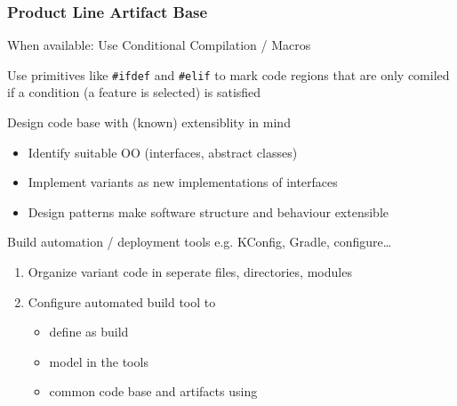 \documentclass[
    ../../Software_Engineering_Summary.tex,
]
{subfiles}
\begin{document}
\subsubsection{Product Line Artifact Base}
When available: Use Conditional Compilation / Macros

\begin{defbox}
    Use primitives like \texttt{\#ifdef} and \texttt{\#elif} to mark code regions that are only comiled if a condition (a feature is selected) is satisfied
\end{defbox}

Design code base with (known) extensiblity in mind

\begin{defbox}
    \begin{itemize}
        \item Identify suitable OO  (interfaces, abstract classes)
        \item Implement variants as new implementations of interfaces
        \item Design patterns make software structure and behaviour extensible
    \end{itemize}
\end{defbox}

Build automation / deployment tools e.g. KConfig, Gradle, configure\dots

\begin{defbox}
    \begin{enumerate}
        \item Organize variant code in seperate files, directories, modules
        \item Configure automated build tool to
        \begin{itemize}
            \item define  as build 
            \item model  in the tools 
            \item {} common code base and artifacts using 
        \end{itemize}
    \end{enumerate}
\end{defbox}
\end{document}
